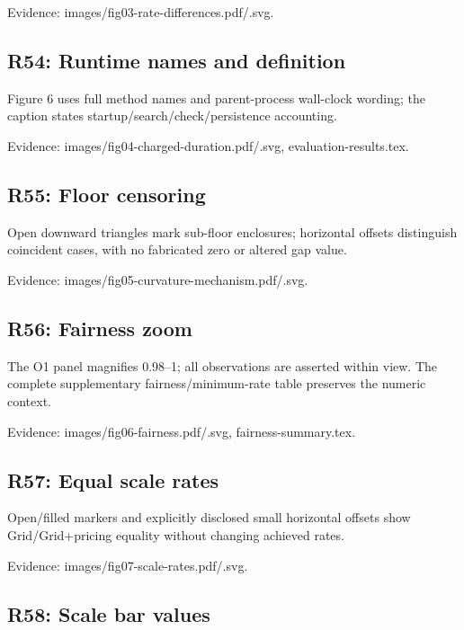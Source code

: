 \documentclass[10pt]{article}
\begin{document}
{\small Evidence: images/\allowbreak fig03-rate-differences.pdf/\allowbreak .svg.}

\subsection*{R54: Runtime names and definition}

Figure 6 uses full method names and parent-process wall-clock wording; the caption states startup/\allowbreak search/\allowbreak check/\allowbreak persistence accounting.

{\small Evidence: images/\allowbreak fig04-charged-duration.pdf/\allowbreak .svg, evaluation-results.tex.}

\subsection*{R55: Floor censoring}

Open downward triangles mark sub-floor enclosures; horizontal offsets distinguish coincident cases, with no fabricated zero or altered gap value.

{\small Evidence: images/\allowbreak fig05-curvature-mechanism.pdf/\allowbreak .svg.}

\subsection*{R56: Fairness zoom}

The O1 panel magnifies 0.98--1; all observations are asserted within view. The complete supplementary fairness/\allowbreak minimum-rate table preserves the numeric context.

{\small Evidence: images/\allowbreak fig06-fairness.pdf/\allowbreak .svg, fairness-summary.tex.}

\subsection*{R57: Equal scale rates}

Open/\allowbreak filled markers and explicitly disclosed small horizontal offsets show Grid/\allowbreak Grid+pricing equality without changing achieved rates.

{\small Evidence: images/\allowbreak fig07-scale-rates.pdf/\allowbreak .svg.}

\subsection*{R58: Scale bar values}
\end{document}
